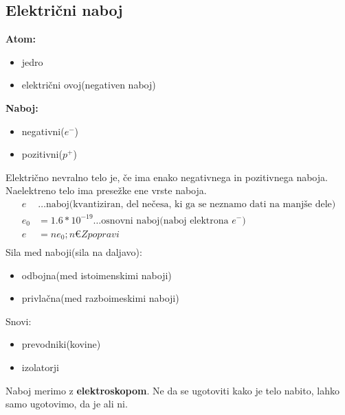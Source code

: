 {\color{indiagreen}\subsection{Električni naboj}}
\textbf{Atom:}
\begin{itemize}
    \item jedro
    \item električni ovoj(negativen naboj)
\end{itemize}
\textbf{Naboj:}
\begin{itemize}
    \item negativni($e^-$)
    \item pozitivni($p^+$)
\end{itemize}
Električno nevralno telo je, če ima enako negativnega in pozitivnega naboja. Naelektreno telo ima presežke ene vrste naboja.\\
\begin{align*}
    e &\dots \text{naboj(kvantiziran, del nečesa, ki ga se neznamo dati na manjše dele)}\\
    e_0 &= 1.6 * 10^{-19}\dots \text{osnovni naboj(naboj elektrona $e^-$)}\\
    e &= ne_0; n € Z popravi \\
\end{align*}
Sila med naboji(sila na daljavo):
\begin{itemize}
    \item odbojna(med istoimenskimi naboji)
    \item privlačna(med razboimeskimi naboji)
\end{itemize}
Snovi:
\begin{itemize}
    \item prevodniki(kovine)
    \item izolatorji
\end{itemize}
Naboj merimo z \textbf{elektroskopom}. Ne da se ugotoviti kako je telo nabito, lahko samo ugotovimo, da je ali ni.
